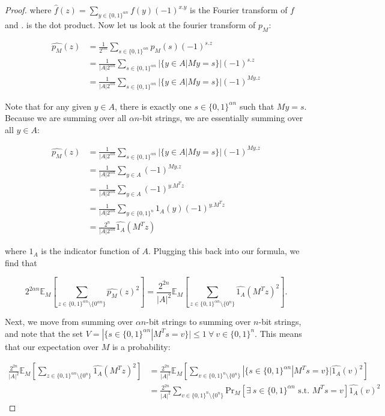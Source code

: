 \documentclass[a4paper]{article}
\begin{document}
\begin{proof}
        where $\widehat{f}(z) = \sum_{y \in \{0, 1\}^{\alpha n}}f(y)(-1)^{x.y}$ is the Fourier transform of $f$ and $.$ is the dot product. Now let us look at the fourier transform of $p_M$:

        \begin{align*}
            \widehat{p_M}(z) &= \frac{1}{2^{\alpha n}}\sum_{s \in \{0, 1\}^{\alpha n}}p_M(s)(-1)^{s.z}\\
            &= \frac{1}{|A|2^{\alpha n}}\sum_{s \in \{0, 1\}^{\alpha n}}|\{y \in A|My = s\}|(-1)^{s.z}\\
            &= \frac{1}{|A|2^{\alpha n}}\sum_{s \in \{0, 1\}^{\alpha n}}|\{y \in A|My = s\}|(-1)^{My.z}
        \end{align*}

        Note that for any given $y \in A$, there is exactly one $s \in \{0, 1\}^{\alpha n}$ such that $My = s$. Because we are summing over all $\alpha n$-bit strings, we are essentially summing over all $y \in A$:

        \begin{align*}
            \widehat{p_M}(z) &= \frac{1}{|A|2^{\alpha n}}\sum_{s \in \{0, 1\}^{\alpha n}}|\{y \in A|My = s\}|(-1)^{My.z}\\
            &= \frac{1}{|A|2^{\alpha n}}\sum_{y \in A}(-1)^{My.z}\\
            &= \frac{1}{|A|2^{\alpha n}}\sum_{y \in A}(-1)^{y.M^Tz}\\
            &= \frac{1}{|A|2^{\alpha n}}\sum_{y \in \{0, 1\}^n}1_A(y)(-1)^{y.M^Tz}\\
            &= \frac{2^n}{|A|2^{\alpha n}}\widehat{1_A}(M^Tz)
        \end{align*}

        where $1_A$ is the indicator function of $A$. Plugging this back into our formula, we find that

        $$2^{2\alpha n}\mathbb{E}_M\left[\sum_{z \in \{0, 1\}^{\alpha n}\setminus\{0^{\alpha n}\}}\widehat{p_M}(z)^2\right] = \frac{2^{2n}}{|A|^2}\mathbb{E}_M\left[\sum_{z \in \{0, 1\}^{\alpha n}\setminus\{0^n\}}\widehat{1_A}(M^Tz)^2\right].$$

        Next, we move from summing over $\alpha n$-bit strings to summing over $n$-bit strings, and note that the set $V = |\{s \in \{0, 1\}^{\alpha n}|M^Ts = v\}| \leq 1 ~\forall~ v \in \{0, 1\}^n$. This means that our expectation over $M$ is a probability:

        \begin{align*}
            \frac{2^{2n}}{|A|^2}\mathbb{E}_M\left[\sum_{z \in \{0, 1\}^{\alpha n}\setminus\{0^n\}}\widehat{1_A}(M^Tz)^2\right] &= \frac{2^{2n}}{|A|^2}\mathbb{E}_M\left[\sum_{v \in \{0, 1\}^n\setminus\{0^n\}}|\{s \in \{0, 1\}^{\alpha n}|M^Ts = v\}|\widehat{1_A}(v)^2\right]\\
            &= \frac{2^{2n}}{|A|^2}\sum_{v \in \{0, 1\}^n\setminus\{0^n\}}\mathrm{Pr}_M[\exists~ s \in \{0, 1\}^{\alpha n} \textrm{ s.t. } M^Ts = v]\widehat{1_A}(v)^2
        \end{align*}


\end{proof}
\end{document}
